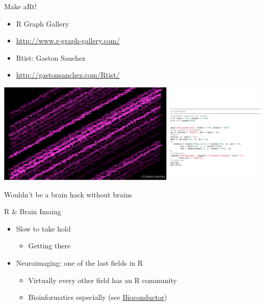 \documentclass[
  ignorenonframetext,
]{beamer}
\providecommand{\tightlist}{%
  \setlength{\itemsep}{0pt}\setlength{\parskip}{0pt}}
\begin{document}
\begin{frame}{Make aRt!}
\protect\hypertarget{make-art}{}

\begin{itemize}
\tightlist
\item
  R Graph Gallery
\item
  \url{http://www.r-graph-gallery.com/}
\item
  Rtist: Gaston Sanchez
\item
  \url{http://gastonsanchez.com/Rtist/}
\end{itemize}

\includegraphics{../external/images/funR_5_aRt_pink_combo.png}

\end{frame}

\begin{frame}{Wouldn't be a brain hack without brains}
\protect\hypertarget{wouldnt-be-a-brain-hack-without-brains}{}

\end{frame}

\begin{frame}{R \& Brain Imaing}
\protect\hypertarget{r-brain-imaing}{}

\begin{itemize}
\tightlist
\item
  Slow to take hold

  \begin{itemize}
  \tightlist
  \item
    Getting there
  \end{itemize}
\item
  Neuroimaging: one of the last fields in R

  \begin{itemize}
  \tightlist
  \item
    Virtually every other field has an R community
  \item
    Bioinformatics especially (see
    \href{https://www.bioconductor.org/}{Bioconductor})
  \end{itemize}
\end{itemize}

\end{frame}
\end{document}
